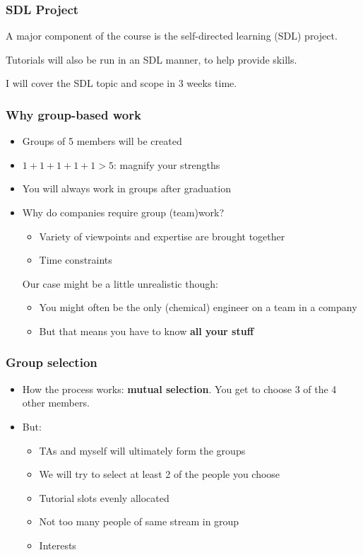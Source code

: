 \begin{frame}\frametitle{SDL Project}
	A major component of the course is the self-directed learning (SDL) project.

	\vspace{12pt}
	Tutorials will also be run in an SDL manner, to help provide skills.

	\vspace{12pt}
	I will cover the SDL topic and scope in 3 weeks time.
\end{frame}

\begin{frame}\frametitle{Why group-based work}
	\begin{itemize}
		\item	Groups of 5 members will be created
		\item	$1+1+1+1+1 > 5$: magnify your strengths
		\item	You will always work in groups after graduation
		\item	Why do companies require group (team)work? 
		\begin{itemize}
			\item	Variety of viewpoints and expertise are brought together
			\item	Time constraints
		\end{itemize}
		\vspace{12pt}
		\pause
		Our case might be a little unrealistic though:
		\begin{itemize}
			\item	You might often be the only (chemical) engineer on a team in a company
			\item	But that means you have to know \textbf{all your stuff}
		\end{itemize}
	\end{itemize}
\end{frame}

\begin{frame}\frametitle{Group selection}
	\begin{itemize}
		\item	How the process works: \textbf{mutual selection}. You get to choose 3 of the 4 other members.
		\item	But:
		\begin{itemize}
			\item	TAs and myself will ultimately form the groups
			\item	We will try to select at least 2 of the people you choose
			\item	Tutorial slots evenly allocated
			\item	Not too many people of same stream in group
			\item	Interests
		\end{itemize}
	\end{itemize}
\end{frame}

